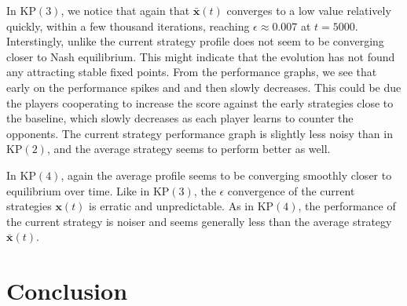 \documentclass{aamas2014}
\newcommand{\bx}{\mathbf{x}}
\begin{document}
In KP$(3)$, we notice that again that $\bar{\bx}(t)$ converges to a low value relatively quickly, within 
a few thousand iterations, reaching $\epsilon \approx 0.007$ at $t = 5000$. Interstingly, unlike 
the current strategy profile does not seem to be converging closer to Nash equilibrium. This might indicate that the evolution 
has not found any attracting stable fixed points. From the performance graphs, we see that early on the performance spikes and 
and then slowly decreases. This could be due the players cooperating to increase the score against the early 
strategies close to the baseline, which slowly decreases as each player learns to counter the opponents. The current strategy
performance graph is slightly less noisy than in KP$(2)$, and the average strategy seems to perform better as well. 

In KP$(4)$, again the average profile seems to be converging smoothly closer to equilibrium over time. Like in KP$(3)$, the 
$\epsilon$ convergence of the current strategies $\bx(t)$ is erratic and unpredictable. As in KP$(4)$, the performance of 
the current strategy is noiser and seems generally less than the average strategy $\bar{\bx}(t)$. 



\section{Conclusion}



%

%
%
\end{document}
